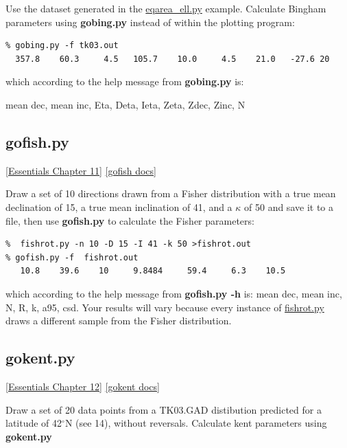 \documentclass[11pt]{book}
\begin{document}
{{{Use the dataset generated in the \href{#eqarea_ell.py}{eqarea\_ell.py} example.   Calculate Bingham parameters using {\bf gobing.py}  instead of within the plotting program:

\begin{verbatim}
% gobing.py -f tk03.out 
  357.8    60.3     4.5   105.7    10.0     4.5    21.0   -27.6 20
\end{verbatim}

\noindent  which according to the help message from {\bf gobing.py} is:  

mean dec, mean inc, Eta, Deta, Ieta, Zeta, Zdec, Zinc, N


\subsection{gofish.py} 
 \href{http://magician.ucsd.edu/Essentials_2/WebBook2ch11.html#ch11}{[Essentials Chapter 11]}
 \href{http://earthref.org/PmagPy/pmagpydocs/gofish-module.html}{[gofish docs]}
 
 Draw a set of 10 directions drawn  from a Fisher distribution with a true mean declination of 15, a true mean inclination of 41, and a $\kappa$ of  50 and save it to a file, then use {\bf gofish.py} to calculate the Fisher parameters:

\begin{verbatim}
%  fishrot.py -n 10 -D 15 -I 41 -k 50 >fishrot.out
% gofish.py -f  fishrot.out 
   10.8    39.6    10     9.8484     59.4     6.3    10.5
   \end{verbatim}
   
\noindent     which according to the help message from {\bf gofish.py -h} is:   mean dec, mean inc, N, R, k, a95, csd.  Your results will vary because every instance of \href{#fishrot.py}{fishrot.py} draws a different sample from the Fisher distribution.   

%

\subsection{gokent.py} 
 \href{http://magician.ucsd.edu/Essentials_2/WebBook2ch11.html#ch11}{[Essentials Chapter 12]}
 \href{http://earthref.org/PmagPy/pmagpydocs/gokent-module.html}{[gokent docs]}

Draw a set of 20 data points  from a TK03.GAD distibution predicted for a latitude of 42$^{\circ}$N (see  14), without  reversals.  Calculate kent parameters using {\bf gokent.py} 

}}}
\end{document}
